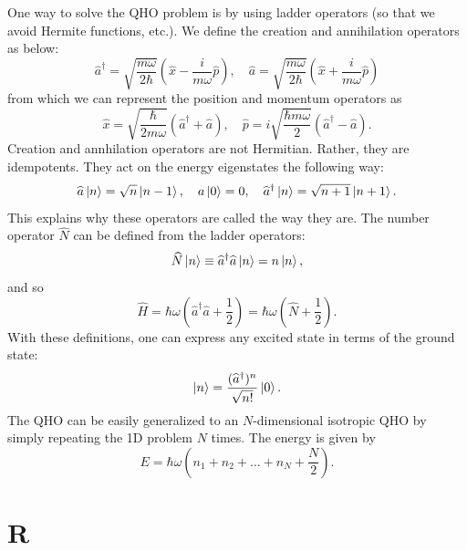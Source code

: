 \documentclass{book}
\theoremstyle{definition}
\newcommand{\f}[2]{\frac{#1}{#2}}
\newcommand{\lp}{\left(}
\newcommand{\rp}{\right)}
\begin{document}
One way to solve the QHO problem is by using ladder operators (so that we avoid Hermite functions, etc.). We define the creation and annihilation operators as below:
\begin{equation*}
\widehat{a}^\dagger = \sqrt{\f{m\omega}{2\hbar}} \lp \widehat{x} - \f{i}{m\omega}\widehat{p} \rp, \quad \widehat{a} = \sqrt{\f{m\omega}{2\hbar}} \lp \widehat{x} + \f{i}{m\omega}\widehat{p} \rp
\end{equation*}
from which we can represent the position and momentum operators as 
\begin{equation*}
\widehat{x} = \sqrt{\f{\hbar}{2m\omega}} (\widehat{a}^\dagger + \widehat{a}), \quad \widehat{p} = i\sqrt{\f{\hbar m\omega}{2}}(\widehat{a}^\dagger - \widehat{a}).
\end{equation*}
Creation and annhilation operators are not Hermitian. Rather, they are idempotents. They act on the energy eigenstates the following way:
\begin{equation*}
\widehat{a}\ket{n} = \sqrt{n}\ket{n-1}, \quad a\ket{0} = 0, \quad \widehat{a}^\dagger\ket{n} = \sqrt{n+1}\ket{n+1}.
\end{equation*}
This explains why these operators are called the way they are. The number operator $\widehat{N}$ can be defined from the ladder operators:
\begin{equation*}
\widehat{N}\ket{n} \equiv \widehat{a}^\dagger \widehat{a}\ket{n} = n\ket{n}, 
\end{equation*}
and so 
\begin{equation*}
\widehat{H} = \hbar\omega\lp \widehat{a}^\dagger \widehat{a} + \f{1}{2} \rp = \hbar\omega \lp \widehat{N} + \f{1}{2} \rp.
\end{equation*}
With these definitions, one can express any excited state in terms of the ground state:
\begin{equation*}
\ket{n} = \f{(\widehat{a}^\dagger)^n}{\sqrt{n!}} \ket{0}.
\end{equation*}
The QHO can be easily generalized to an $N$-dimensional isotropic QHO by simply repeating the 1D problem $N$ times. The energy is given by 
\begin{equation*}
E = \hbar\omega\lp n_1 + n_2 + \dots + n_N + \f{N}{2} \rp.
\end{equation*}



\chapter*{R}
\end{document}

